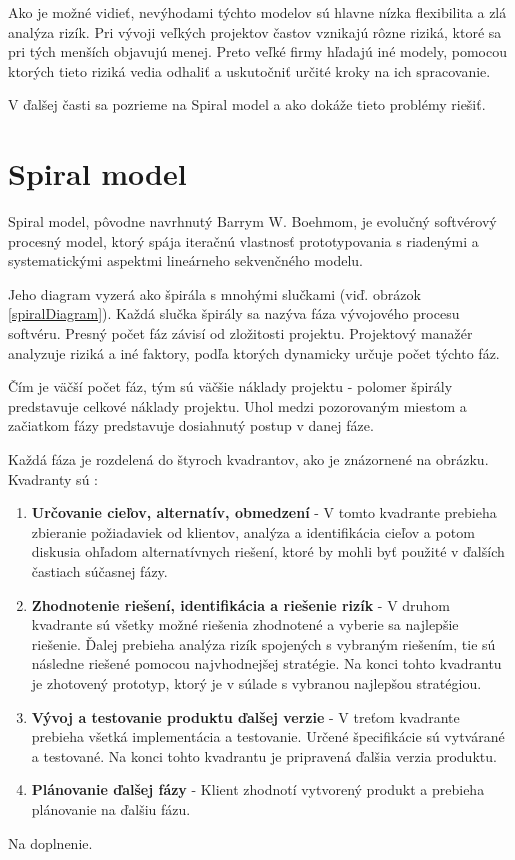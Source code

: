\documentclass[10pt,twoside,slovak,a4paper]{article}
\begin{document}
Ako je možné vidieť, nevýhodami týchto modelov sú hlavne nízka flexibilita a zlá analýza rizík. Pri vývoji veľkých projektov častov vznikajú rôzne riziká, ktoré sa pri tých menších objavujú menej. Preto veľké firmy hľadajú iné modely, pomocou ktorých tieto riziká vedia odhaliť a uskutočniť určité kroky na ich spracovanie.

V ďalšej časti sa pozrieme na Spiral model a ako dokáže tieto problémy riešiť.


\section{Spiral model} \label{spiralModel}
Spiral model, pôvodne navrhnutý Barrym W. Boehmom, je evolučný softvérový procesný model, ktorý spája iteračnú vlastnosť prototypovania s riadenými a systematickými aspektmi lineárneho sekvenčného modelu. \cite{SpiralModelDef}

Jeho diagram vyzerá ako špirála s mnohými slučkami (viď. obrázok \ref{spiralDiagram}). Každá slučka špirály sa nazýva fáza vývojového procesu softvéru. Presný počet fáz závisí od zložitosti projektu. Projektový manažér analyzuje riziká a iné faktory, podľa ktorých dynamicky určuje počet týchto fáz.

Čím je väčší počet fáz, tým sú väčšie náklady projektu - polomer špirály predstavuje celkové náklady projektu. Uhol medzi pozorovaným miestom a začiatkom fázy predstavuje dosiahnutý postup v danej fáze. \cite{SpiralModelDef1}

Každá fáza je rozdelená do štyroch kvadrantov, ako je znázornené na obrázku. Kvadranty sú \cite{SpiralModelDef1}:
\begin{enumerate}
\item \textbf{Určovanie cieľov, alternatív, obmedzení } - V tomto kvadrante prebieha zbieranie požiadaviek od klientov, analýza a identifikácia cieľov a potom diskusia ohľadom alternatívnych riešení, ktoré by mohli byť použité v ďalších častiach súčasnej fázy.
\item \textbf{Zhodnotenie riešení, identifikácia a riešenie rizík } - V druhom kvadrante sú všetky možné riešenia zhodnotené a vyberie sa najlepšie riešenie. Ďalej prebieha analýza rizík spojených s vybraným riešením, tie sú následne riešené pomocou najvhodnejšej stratégie. Na konci tohto kvadrantu je zhotovený prototyp, ktorý je v súlade s vybranou najlepšou stratégiou.
\item \textbf{Vývoj a testovanie produktu ďalšej verzie} - V treťom kvadrante prebieha všetká implementácia a testovanie. Určené špecifikácie sú vytvárané a testované. Na konci tohto kvadrantu je pripravená ďalšia verzia produktu.
\item \textbf{Plánovanie ďalšej fázy} - Klient zhodnotí vytvorený produkt a prebieha plánovanie na ďalšiu fázu.
\end{enumerate}
Na doplnenie.
\end{document}

